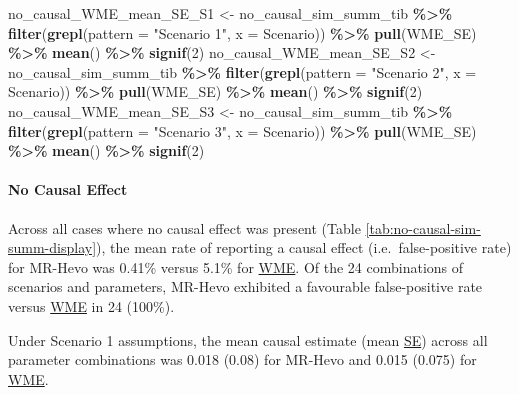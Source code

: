 \documentclass[
]{article}
\newenvironment{Shaded}{\begin{snugshade}}{\end{snugshade}}
\newcommand{\AttributeTok}[1]{\textcolor[rgb]{0.13,0.29,0.53}{#1}}
\newcommand{\DecValTok}[1]{\textcolor[rgb]{0.00,0.00,0.81}{#1}}
\newcommand{\FunctionTok}[1]{\textcolor[rgb]{0.13,0.29,0.53}{\textbf{#1}}}
\newcommand{\NormalTok}[1]{#1}
\newcommand{\OtherTok}[1]{\textcolor[rgb]{0.56,0.35,0.01}{#1}}
\newcommand{\SpecialCharTok}[1]{\textcolor[rgb]{0.81,0.36,0.00}{\textbf{#1}}}
\newcommand{\StringTok}[1]{\textcolor[rgb]{0.31,0.60,0.02}{#1}}
\begin{document}
\begin{Shaded}
\begin{Highlighting}[]
\NormalTok{no\_causal\_WME\_mean\_SE\_S1 }\OtherTok{\textless{}{-}}\NormalTok{  no\_causal\_sim\_summ\_tib }\SpecialCharTok{\%\textgreater{}\%} \FunctionTok{filter}\NormalTok{(}\FunctionTok{grepl}\NormalTok{(}\AttributeTok{pattern =} \StringTok{"Scenario 1"}\NormalTok{, }\AttributeTok{x =}\NormalTok{ Scenario)) }\SpecialCharTok{\%\textgreater{}\%} \FunctionTok{pull}\NormalTok{(WME\_SE) }\SpecialCharTok{\%\textgreater{}\%} \FunctionTok{mean}\NormalTok{() }\SpecialCharTok{\%\textgreater{}\%} \FunctionTok{signif}\NormalTok{(}\DecValTok{2}\NormalTok{)}
\NormalTok{no\_causal\_WME\_mean\_SE\_S2 }\OtherTok{\textless{}{-}}\NormalTok{  no\_causal\_sim\_summ\_tib }\SpecialCharTok{\%\textgreater{}\%} \FunctionTok{filter}\NormalTok{(}\FunctionTok{grepl}\NormalTok{(}\AttributeTok{pattern =} \StringTok{"Scenario 2"}\NormalTok{, }\AttributeTok{x =}\NormalTok{ Scenario)) }\SpecialCharTok{\%\textgreater{}\%} \FunctionTok{pull}\NormalTok{(WME\_SE) }\SpecialCharTok{\%\textgreater{}\%} \FunctionTok{mean}\NormalTok{() }\SpecialCharTok{\%\textgreater{}\%} \FunctionTok{signif}\NormalTok{(}\DecValTok{2}\NormalTok{)}
\NormalTok{no\_causal\_WME\_mean\_SE\_S3 }\OtherTok{\textless{}{-}}\NormalTok{  no\_causal\_sim\_summ\_tib }\SpecialCharTok{\%\textgreater{}\%} \FunctionTok{filter}\NormalTok{(}\FunctionTok{grepl}\NormalTok{(}\AttributeTok{pattern =} \StringTok{"Scenario 3"}\NormalTok{, }\AttributeTok{x =}\NormalTok{ Scenario)) }\SpecialCharTok{\%\textgreater{}\%} \FunctionTok{pull}\NormalTok{(WME\_SE) }\SpecialCharTok{\%\textgreater{}\%} \FunctionTok{mean}\NormalTok{() }\SpecialCharTok{\%\textgreater{}\%} \FunctionTok{signif}\NormalTok{(}\DecValTok{2}\NormalTok{)}
\end{Highlighting}
\end{Shaded}

\paragraph{No Causal Effect}\label{results-sim-no-causal}

\leavevmode\newline Across all cases where no causal effect was present (Table \ref{tab:no-causal-sim-summ-display}), the mean rate of reporting a causal effect (i.e.~false-positive rate) for MR-Hevo was 0.41\% versus 5.1\% for \hyperref[acronyms_WME]{WME}. Of the 24 combinations of scenarios and parameters, MR-Hevo exhibited a favourable false-positive rate versus \hyperref[acronyms_WME]{WME} in 24 (100\%).

Under Scenario 1 assumptions, the mean causal estimate (mean \hyperref[acronyms_SE]{SE}) across all parameter combinations was 0.018 (0.08) for MR-Hevo and 0.015 (0.075) for \hyperref[acronyms_WME]{WME}.
\end{document}
